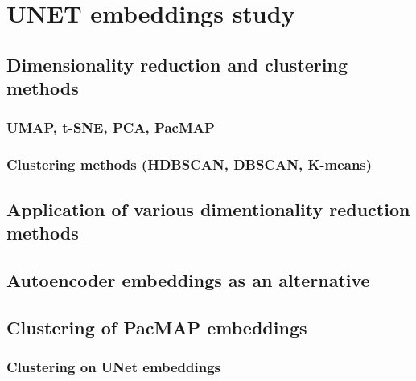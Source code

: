 \section{UNET embeddings study}
    \subsection{Dimensionality reduction and clustering methods}
        \subsubsection{UMAP, t-SNE, PCA, PacMAP}
        \subsubsection{Clustering methods (HDBSCAN, DBSCAN, K-means)}
    \subsection{Application of various dimentionality reduction methods}
        
    \subsection{Autoencoder embeddings as an alternative}
        
    \clearpage
    \subsection{Clustering of PacMAP embeddings}
        \subsubsection{Clustering on UNet embeddings}
        